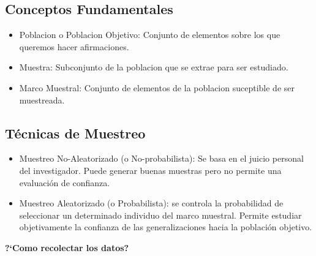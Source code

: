 	\subsection{Conceptos Fundamentales}
		\begin{itemize}
			\item Poblacion o Poblacion Objetivo: Conjunto de elementos sobre los que queremos hacer afirmaciones.
			\item Muestra: Subconjunto de la poblacion que se extrae para ser estudiado.
			\item Marco Muestral: Conjunto de elementos de la poblacion suceptible de ser muestreada.
		\end{itemize}
	\subsection{T\'ecnicas de Muestreo}
		\begin{itemize}
			\item Muestreo No-Aleatorizado (o No-probabilista): Se basa en el juicio personal del investigador. Puede generar buenas muestras pero no permite una evaluaci\'on de confianza.
			\item Muestreo Aleatorizado (o Probabilista): se controla la probabilidad de seleccionar un determinado individuo del marco muestral. Permite estudiar objetivamente la confianza de las generalizaciones hacia la poblaci\'on objetivo.
		\end{itemize}
		\textbf{?`Como recolectar los datos?}\\
